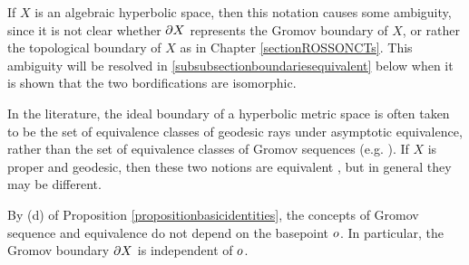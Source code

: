 \begin{remark}
\label{remarkambiguityboundary}
If $X$ is an algebraic hyperbolic space, then this notation causes some ambiguity, since it is not clear whether $\partial X$ represents the Gromov boundary of $X$, or rather the topological boundary of $X$ as in Chapter \ref{sectionROSSONCTs}. This ambiguity will be resolved in \6\ref{subsubsectionboundariesequivalent} below when it is shown that the two bordifications are isomorphic.
\end{remark}

\begin{remark}
\label{remarkambiguityboundary2}
In the literature, the ideal boundary of a hyperbolic metric space is often taken to be the set of equivalence classes of geodesic rays under asymptotic equivalence, rather than the set of equivalence classes of Gromov sequences (e.g. \cite[p.427]{BridsonHaefliger}). If $X$ is proper and geodesic, then these two notions are equivalent \cite[Lemma III.H.3.13]{BridsonHaefliger}, but in general they may be different.
\end{remark}

\begin{remark}
\label{remarkbasepoint1}
By (d) of Proposition \ref{propositionbasicidentities}, the concepts of Gromov sequence and equivalence do not depend on the basepoint $o$. In particular, the Gromov boundary $\partial X$ is independent of $o$.
\end{remark}

